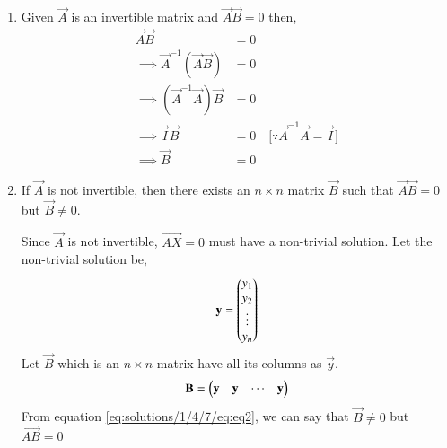 \begin{enumerate}
\item Given $\vec{A}$ is an invertible matrix and $\vec{A}\vec{B}=0$ then,
\begin{align}
    \vec{A}\vec{B}&=0\\
\implies \vec{A}^{-1}(\vec{A}\vec{B})&=0\\
\implies (\vec{A}^{-1}\vec{A})\vec{B}&=0\\
\implies \vec{I}\vec{B}&=0\quad{\text{[$\because \vec{A}^{-1}\vec{A} = \vec{I}$]}}\\
\implies \vec{B}&=0 \label{eq:solutions/1/4/7/eq:eq1}
\end{align}
   \item If $\vec{A}$ is not invertible, then there exists an $n \times n$ matrix $\vec{B}$ such that $\vec{A}\vec{B}=0$ but $\vec{B} \not= 0$.

Since $\vec{A}$ is not invertible, $\vec{AX}=0$ must have a non-trivial solution. Let the non-trivial solution be,
\begin{align}
    \mathbf{y} = \begin{pmatrix}y_1\\y_2\\ \vdots \\y_n\end{pmatrix}
\end{align}
Let $\vec{B}$ which is an $n \times n$ matrix have all its columns as $\vec{y}$.
\begin{align}
    \mathbf{B} = \begin{pmatrix}\mathbf{y}&\mathbf{y} &\cdots &\mathbf{y}\end{pmatrix} \label{eq:solutions/1/4/7/eq:eq2}
\end{align}
From equation \eqref{eq:solutions/1/4/7/eq:eq2}, we can say that $\vec{B} \not= 0$ but $\vec{AB}=0$
\end{enumerate}
